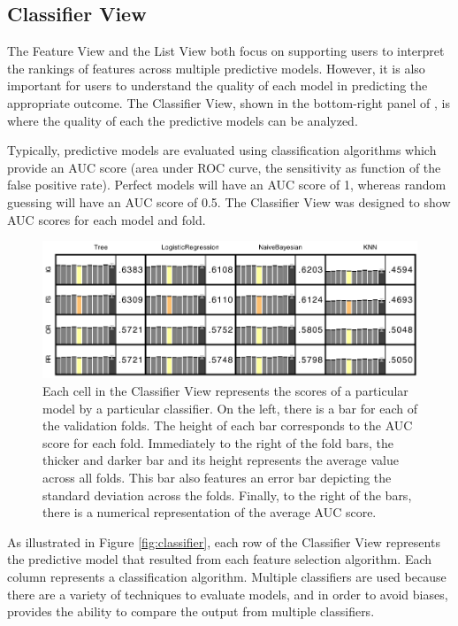 \subsection{Classifier View}

The Feature View and the List View both focus on supporting users to interpret the rankings of features across multiple predictive models.  However, it is also important for users to understand the quality of each model in predicting the appropriate outcome.  The Classifier View, shown in the bottom-right panel of \infuse, is where the quality of each the predictive models can be analyzed.

Typically, predictive models are evaluated using classification algorithms which provide an AUC score (area under ROC curve,
the sensitivity as function of the false positive rate).  Perfect models will have an AUC score of 1, whereas random guessing will have an AUC score of 0.5.  The Classifier View was designed to show AUC scores for each model and fold.

\begin{figure}[t]
\centering
\includegraphics[width=0.4\linewidth]{infuse/classifier-cell}
\caption[A cell of the Classifier View.]{
Each cell in the Classifier View represents the scores of a particular model by a particular classifier.
On the left, there is a bar for each of the validation folds.  The height of each bar corresponds to the AUC score for each fold.  Immediately to the right of the fold bars, the thicker and darker bar and its height represents the average value across all folds.  This bar also features an error bar depicting the standard deviation across the folds.  Finally, to the right of the bars, there is a numerical representation of the average AUC score.}
\label{fig:classifier-cell}
\end{figure}

As illustrated in Figure \ref{fig:classifier}, each row of the Classifier View represents the predictive model that resulted from each feature selection algorithm.  Each column represents a classification algorithm.  Multiple classifiers are used because there are a variety of techniques to evaluate models, and in order to avoid biases, \infuse provides the ability to compare the output from multiple classifiers.


